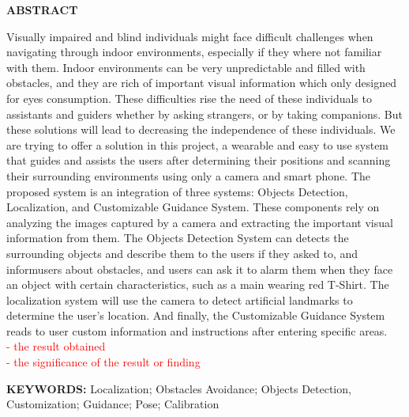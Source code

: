 

\newpage
\thispagestyle{plain}
\setcounter{page}{1}
\renewcommand{\thepage}{\roman{page}}

\begin{center}
    \Large\textbf{ABSTRACT}
\end{center}
\vspace{6pt}


Visually impaired and blind individuals might face difficult challenges when navigating through indoor environments, especially if they where not familiar with them. Indoor environments can be very unpredictable and filled with obstacles, and they are rich of important visual information which only designed for eyes consumption. These difficulties rise the need of these individuals to assistants and guiders whether by asking strangers, or by taking companions. But
these solutions will lead to decreasing the independence of these individuals. We are trying to offer a solution in this project, a wearable and easy to use system that guides and assists the users after determining their positions and scanning their surrounding environments using only a camera and smart phone. The proposed system is an integration of three systems: Objects Detection, Localization, and Customizable Guidance System. These components rely on analyzing the images captured by a camera and extracting the important visual information from them. The Objects Detection System can detects the surrounding objects and describe them to the users if they asked to, and informusers about obstacles, and users can ask it to alarm them when they face an object with certain characteristics, such as a main wearing red T-Shirt. The localization system will use the camera to detect artificial landmarks to determine the user’s location. And finally, the Customizable Guidance System reads to user custom information and instructions after entering specific areas. \\
\textcolor{red} {
	- the result obtained\\
	- the significance of the result or finding 
}





\vspace{18pt}
\noindent
\textbf{KEYWORDS:}  Localization; Obstacles Avoidance; Objects Detection, Customization; Guidance; Pose; Calibration
\vspace{3\baselineskip}
